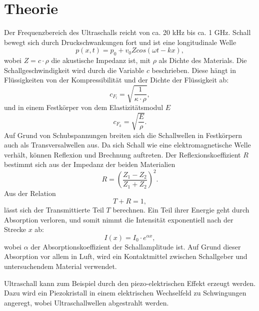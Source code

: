 

\section{Theorie}
\label{sec:Theorie}

Der Frequenzbereich des Ultraschalls reicht von ca. 20 \si{\kilo\hertz} bis ca. 1 \si{\giga\hertz}.
Schall bewegt sich durch Druckschwankungen fort und ist eine longitudinale Welle
\begin{equation}
p(x,t) = p_0 + v_0 Z cos(\omega t - kx) ,
\end{equation}
wobei $Z = c \cdot \rho $ die akustische Impedanz ist, mit $\rho$ als Dichte des Materials.
Die Schallgeschwindigkeit wird durch die Variable $c$ beschrieben.
Diese hängt in Flüssigkeiten von der Kompressibilität \kappa und der Dichte \rho der Flüssigkeit ab:
\begin{equation}
c_{F_l} = \sqrt{\frac{1}{\kappa \cdot \rho}} ,
\end{equation}
und in einem Festkörper von dem Elastizitätsmodul $E$
\begin{equation}
c_{F_k} = \sqrt{\frac{E}{\rho}} .
\end{equation}
Auf Grund von Schubspannungen breiten sich die Schallwellen in Festkörpern auch als Transversalwellen aus.
Da sich Schall wie eine elektromagnetische Welle verhält, können Reflexion und Brechnung auftreten.
Der Reflexionskoeffizient $R$ bestimmt sich aus der Impedanz der beiden Materialien
\begin{equation}
R = \left(\frac{Z_1 - Z_2}{Z_1 + Z_2}\right)^2 .
\end{equation}
Aus der Relation
\begin{equation}
T + R = 1 ,
\end{equation}
lässt sich der Transmittierte Teil $T$ berechnen.
Ein Teil ihrer Energie geht durch Absorption verloren, und somit nimmt die Intensität exponentiell nach der Strecke $x$ ab:
\begin{equation}
I(x) = I_0 \cdot e^{\alpha x} ,
\end{equation}
wobei $\alpha$ der Absorptionskoeffizient der Schallamplitude ist. Auf Grund dieser Absorption vor allem in Luft, wird ein Kontaktmittel zwischen Schallgeber und untersuchendem Material verwendet.

\noindent Ultraschall kann zum Beispiel durch den piezo-elektrischen Effekt erzeugt werden. 
Dazu wird ein Piezokristall in einem elektrischen Wechselfeld zu Schwingungen angeregt, wobei Ultraschallwellen abgestrahlt werden.

